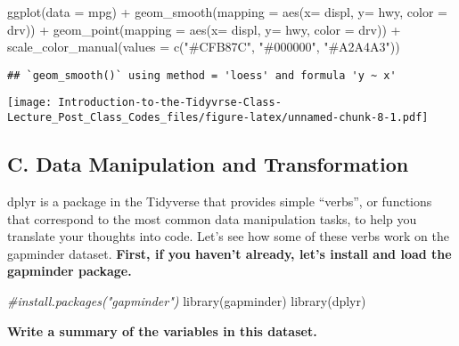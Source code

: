 \documentclass[
]{article}
\newenvironment{Shaded}{\begin{snugshade}}{\end{snugshade}}
\newcommand{\AttributeTok}[1]{\textcolor[rgb]{0.77,0.63,0.00}{#1}}
\newcommand{\CommentTok}[1]{\textcolor[rgb]{0.56,0.35,0.01}{\textit{#1}}}
\newcommand{\FunctionTok}[1]{\textcolor[rgb]{0.00,0.00,0.00}{#1}}
\newcommand{\NormalTok}[1]{#1}
\newcommand{\SpecialCharTok}[1]{\textcolor[rgb]{0.00,0.00,0.00}{#1}}
\newcommand{\StringTok}[1]{\textcolor[rgb]{0.31,0.60,0.02}{#1}}
\begin{document}
\begin{Shaded}
\begin{Highlighting}[]
\FunctionTok{ggplot}\NormalTok{(}\AttributeTok{data =}\NormalTok{ mpg) }\SpecialCharTok{+} 
  \FunctionTok{geom\_smooth}\NormalTok{(}\AttributeTok{mapping =} \FunctionTok{aes}\NormalTok{(}\AttributeTok{x=}\NormalTok{ displ, }\AttributeTok{y=}\NormalTok{ hwy, }\AttributeTok{color =}\NormalTok{ drv)) }\SpecialCharTok{+}
  \FunctionTok{geom\_point}\NormalTok{(}\AttributeTok{mapping =} \FunctionTok{aes}\NormalTok{(}\AttributeTok{x=}\NormalTok{ displ, }\AttributeTok{y=}\NormalTok{ hwy, }\AttributeTok{color =}\NormalTok{ drv)) }\SpecialCharTok{+}
\FunctionTok{scale\_color\_manual}\NormalTok{(}\AttributeTok{values =} \FunctionTok{c}\NormalTok{(}\StringTok{"\#CFB87C"}\NormalTok{, }\StringTok{"\#000000"}\NormalTok{, }\StringTok{"\#A2A4A3"}\NormalTok{))}
\end{Highlighting}
\end{Shaded}

\begin{verbatim}
## `geom_smooth()` using method = 'loess' and formula 'y ~ x'
\end{verbatim}

\texttt{[image: Introduction-to-the-Tidyvrse-Class-Lecture\_Post\_Class\_Codes\_files/figure-latex/unnamed-chunk-8-1.pdf]}

\hypertarget{c.-data-manipulation-and-transformation}{%
\subsection{C. Data Manipulation and
Transformation}\label{c.-data-manipulation-and-transformation}}

dplyr is a package in the Tidyverse that provides simple ``verbs'', or
functions that correspond to the most common data manipulation tasks, to
help you translate your thoughts into code. Let's see how some of these
verbs work on the gapminder dataset. \textbf{First, if you haven't
already, let's install and load the gapminder package.}

\begin{Shaded}
\begin{Highlighting}[]
\CommentTok{\#install.packages("gapminder")}
\FunctionTok{library}\NormalTok{(gapminder)}
\FunctionTok{library}\NormalTok{(dplyr)}
\end{Highlighting}
\end{Shaded}

\textbf{Write a summary of the variables in this dataset. }
\end{document}
